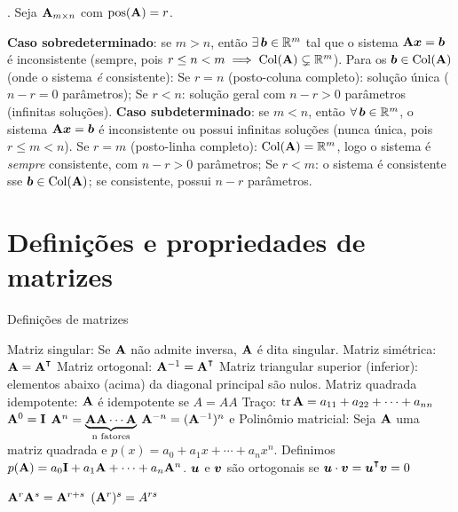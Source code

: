 \begin{theorem}. Seja $\mathbf{A}_{m\times n}$ com $\operatorname{pos}(\mathbf{A})=r$.
	\begin{outline}
		\1 \textbf{Caso sobredeterminado}: se $m>n$, então $\exists\, \bm{b} \in \mathbb{R}^m$ tal que o sistema $\mathbf{A}\bm{x}=\bm{b}$ é inconsistente (sempre, pois $r \leq n < m \implies \operatorname{Col}(\mathbf{A}) \subsetneq \mathbb{R}^m$).
		\2 Para os $\bm{b} \in \operatorname{Col}(\mathbf{A})$ (onde o sistema \emph{é} consistente):
		\3 Se $r=n$ (posto-coluna completo): solução única ($n-r=0$ parâmetros);
		\3 Se $r<n$: solução geral com $n-r>0$ parâmetros (infinitas soluções).
		\1 \textbf{Caso subdeterminado}: se $m<n$, então $\forall\, \bm{b} \in \mathbb{R}^m$, o sistema $\mathbf{A}\bm{x}=\bm{b}$ é inconsistente ou possui infinitas soluções (nunca única, pois $r \leq m < n$).
		\2 Se $r=m$ (posto-linha completo): $\operatorname{Col}(\mathbf{A})=\mathbb{R}^m$, logo o sistema é \emph{sempre} consistente, com $n-r>0$ parâmetros;
		\2 Se $r<m$: o sistema é consistente sse $\bm{b} \in \operatorname{Col}(\mathbf{A})$; se consistente, possui $n-r$ parâmetros.
	\end{outline}
\end{theorem}

\section{Definições e propriedades de matrizes}

\begin{definition} Definições de matrizes
	\leavevmode
	\begin{outline}[enumerate]
		\1 Matriz singular: Se $\mathbf{A}$ não admite inversa, $\mathbf{A}$ é dita singular.
		\1 Matriz simétrica: $\m{A} = \m{A}\T$
		\1 Matriz ortogonal: \( \m{A}\inv = \m{A}\T \)
		\1 Matriz triangular superior (inferior): elementos abaixo (acima) da diagonal principal são nulos.
		\1 Matriz quadrada idempotente: $\mathbf{A}$ é idempotente se $A=AA$
		\1 Traço: $\operatorname{tr}{\mathbf{A}} = a_{11} + a_{22} + \cdots + a_{nn}$
		\1 \( \mathbf{A}^0 = \mathbf{I} \)
		\1 \( \mathbf{A}^n = \underbrace{\mathbf{A}\mathbf{A}\cdots\mathbf{A}}_{\text{n fatores}} \)
		\1 \( \mathbf{A}^{-n} = (\mathbf{A}^{-1})^n \) e
		\1 Polinômio matricial: Seja $\mathbf{A}$ uma matriz quadrada e $p(x) = a_0 + a_1 x + \cdots + a_n x^n$. Definimos $p(\mathbf{A}) = a_0\mathbf{I} + a_1\mathbf{A} + \cdots + a_n\mathbf{A}^n$.
		\1 $\bm{u}$ e $\bm{v}$ são ortogonais se $\v{u}\cdot\v{v} = \v{u}\T\v{v} = 0$
	\end{outline}
\end{definition}

\begin{theorem}
	\leavevmode
	\begin{outline}[enumerate]
		\1 \( \mathbf{A}^r\mathbf{A}^s = \mathbf{A}^{r+s} \)
		\1 \( (\mathbf{A}^r)^s = A^{rs} \)
	\end{outline}
\end{theorem}

